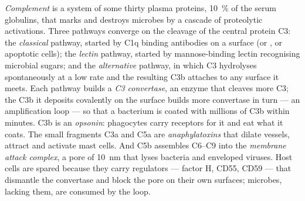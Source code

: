 \begin{definition}[Complement]\label{def:b3:innate-immunity:complement}
\emph{Complement} is a system of some thirty plasma proteins,
\qty{10}{\%} of the serum globulins, that marks and destroys microbes
by a cascade of proteolytic activations. Three pathways converge on the
cleavage of the central protein C3: the \emph{classical} pathway,
started by C1q binding antibodies on a surface (or ,
or apoptotic cells); the \emph{lectin} pathway, started by
mannose-binding lectin recognising microbial sugars; and the
\emph{alternative} pathway, in which C3 hydrolyses spontaneously at a
low rate and the resulting C3b attaches to any surface it meets. Each
pathway builds a \emph{C3 convertase}, an enzyme that cleaves more C3;
the C3b it deposits covalently on the surface builds more convertase in
turn --- an amplification loop --- so that a bacterium is coated with
millions of C3b within minutes. C3b is an \emph{opsonin}: phagocytes
carry receptors for it and eat what it coats. The small fragments C3a
and C5a are \emph{anaphylatoxins} that dilate vessels, attract
 and activate mast cells. And C5b assembles C6--C9 into the
\emph{membrane attack complex}, a pore of \qty{10}{nm} that lyses
 bacteria and enveloped viruses. Host cells are spared
because they carry regulators --- factor H, CD55, CD59 --- that
dismantle the convertase and block the pore on their own surfaces;
microbes, lacking them, are consumed by the loop.
\end{definition}

